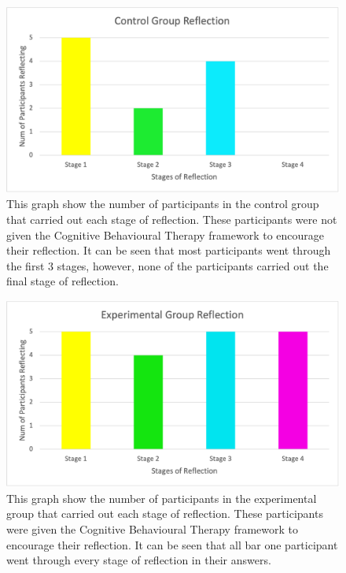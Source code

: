 \documentclass{l4proj}
\begin{document}
\begin{figure}[h!]
    \begin{centering}
    \includegraphics[scale=0.75]{images/ABControlGraph.png}
    \caption{This graph show the number of participants in the control group that carried out each stage of reflection. These participants were not given the Cognitive Behavioural Therapy framework to encourage their reflection. It can be seen that most participants went through the first 3 stages, however, none of the participants carried out the final stage of reflection.}
    \label{fig: ABStudyGraphControl}
    \end{centering}
\end{figure}

\begin{figure}[h!]
    \begin{centering}
    \includegraphics[scale=0.75]{images/ABExperimentGraph.png}
    \caption{This graph show the number of participants in the experimental group that carried out each stage of reflection. These participants were given the Cognitive Behavioural Therapy framework to encourage their reflection. It can be seen that all bar one participant went through every stage of reflection in their answers.}
    \label{fig: ABStudyGraphExperiment}
    \end{centering}
\end{figure}
\end{document}
